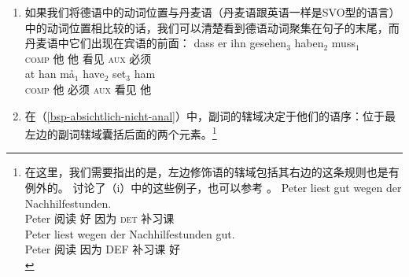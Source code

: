 \begin{enumerate}
\item 如果我们将德语中的动词位置与丹麦语（丹麦语跟英语一样是SVO型的语言）中的动词位置相比较的话，我们可以清楚看到德语动词聚集在句子的末尾，而丹麦语中它们出现在宾语的前面\citep[]{Oersnes2009b}：
\eal
\ex 
\gll dass er ihn gesehen$_3$ haben$_2$ muss$_1$\\
	 \textsc{comp} 他 他 看见 \textsc{aux} 必须\\
\ex 
\gll at han må$_1$ have$_2$ set$_3$ ham\\
     \textsc{comp} 他 必须 \textsc{aux} 看见 他\\
\zl
\item\label{SOV-Skopus} 在（\ref{bsp-absichtlich-nicht-anal}）中，副词的辖域决定于他们的语序：位于最左边的副词辖域囊括后面的两个元素。\footnote{%
在这里，我们需要指出的是，左边修饰语的辖域包括其右边的这条规则也是有例外的。 \citet*[]{Kasper94a}讨论了（i）中的这些例子，也可以参考 \citet*[]{BV72}。
\eal
\label{bsp-peter-liest-gut-wegen}
\ex 
\gll Peter liest gut wegen der Nachhilfestunden.\\
	 Peter 阅读 好 因为 \textsc{det} 补习课\\
\ex 
\gll Peter liest wegen der Nachhilfestunden gut.\\
	 Peter 阅读 因为 DEF 补习课 好\\
}
\end{enumerate}
